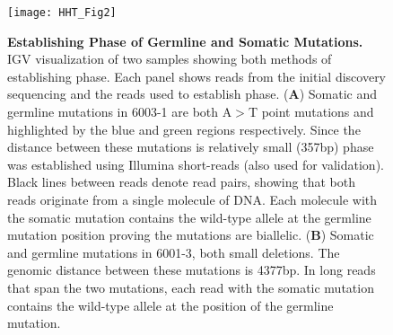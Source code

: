 \begin{figure}[tbp!]
\begin{center}
\texttt{[image: HHT\_Fig2]}
\end{center}

\caption[Establishing Phase of Germline and Somatic Mutations.]{\textbf{Establishing Phase of Germline and Somatic Mutations.}\\IGV visualization of two samples showing both methods of establishing phase. Each panel shows reads from the initial discovery sequencing and the reads used to establish phase. (\textbf{A}) Somatic and germline mutations in 6003-1 are both A$>$T point mutations and highlighted by the blue and green regions respectively. Since the distance between these mutations is relatively small (357bp) phase was established using Illumina short-reads (also used for validation). Black lines between reads denote read pairs, showing that both reads originate from a single molecule of DNA. Each molecule with the somatic mutation contains the wild-type allele at the germline mutation position proving the mutations are biallelic. (\textbf{B}) Somatic and germline mutations in 6001-3, both small deletions. The genomic distance between these mutations is 4377bp. In long reads that span the two mutations, each read with the somatic mutation contains the wild-type allele at the position of the germline mutation.}

\label{HHT_Figure_2}
\end{figure}

